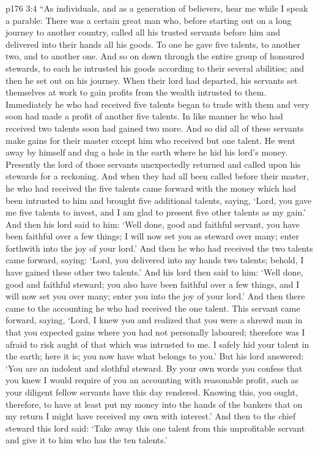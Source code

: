\vs p176 3:4 “As individuals, and as a generation of believers, hear me while I speak a parable: There was a certain great man who, before starting out on a long journey to another country, called all his trusted servants before him and delivered into their hands all his goods. To one he gave five talents, to another two, and to another one. And so on down through the entire group of honoured stewards, to each he intrusted his goods according to their several abilities; and then he set out on his journey. When their lord had departed, his servants set themselves at work to gain profits from the wealth intrusted to them. Immediately he who had received five talents began to trade with them and very soon had made a profit of another five talents. In like manner he who had received two talents soon had gained two more. And so did all of these servants make gains for their master except him who received but one talent. He went away by himself and dug a hole in the earth where he hid his lord’s money. Presently the lord of those servants unexpectedly returned and called upon his stewards for a reckoning. And when they had all been called before their master, he who had received the five talents came forward with the money which had been intrusted to him and brought five additional talents, saying, ‘Lord, you gave me five talents to invest, and I am glad to present five other talents as my gain.’ And then his lord said to him: ‘Well done, good and faithful servant, you have been faithful over a few things; I will now set you as steward over many; enter forthwith into the joy of your lord.’ And then he who had received the two talents came forward, saying: ‘Lord, you delivered into my hands two talents; behold, I have gained these other two talents.’ And his lord then said to him: ‘Well done, good and faithful steward; you also have been faithful over a few things, and I will now set you over many; enter you into the joy of your lord.’ And then there came to the accounting he who had received the one talent. This servant came forward, saying, ‘Lord, I knew you and realized that you were a shrewd man in that you expected gains where you had not personally laboured; therefore was I afraid to risk aught of that which was intrusted to me. I safely hid your talent in the earth; here it is; you now have what belongs to you.’ But his lord answered: ‘You are an indolent and slothful steward. By your own words you confess that you knew I would require of you an accounting with reasonable profit, such as your diligent fellow servants have this day rendered. Knowing this, you ought, therefore, to have at least put my money into the hands of the bankers that on my return I might have received my own with interest.’ And then to the chief steward this lord said: ‘Take away this one talent from this unprofitable servant and give it to him who has the ten talents.’
